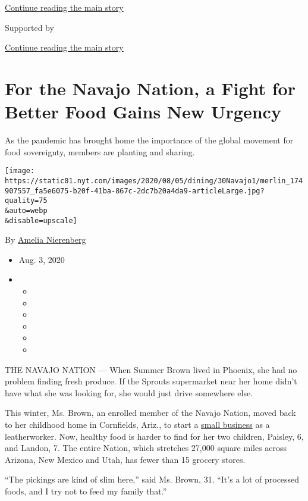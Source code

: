 \protect\hyperlink{after-top}{Continue reading the main story}

Supported by

\protect\hyperlink{after-sponsor}{Continue reading the main story}

\hypertarget{for-the-navajo-nation-a-fight-for-better-food-gains-new-urgency-}{%
\section{For the Navajo Nation, a Fight for Better Food Gains New
Urgency
}\label{for-the-navajo-nation-a-fight-for-better-food-gains-new-urgency-}}

As the pandemic has brought home the importance of the global movement
for food sovereignty, members are planting and sharing.

\texttt{[image: https://static01.nyt.com/images/2020/08/05/dining/30Navajo1/merlin\_174907557\_fa5e6075-b20f-41ba-867c-2dc7b20a4da9-articleLarge.jpg?quality=75\\\&auto=webp\\\&disable=upscale]}

By \href{https://www.nytimes.com/by/amelia-nierenberg}{Amelia
Nierenberg}

\begin{itemize}
\item
  Aug. 3, 2020
\item
  \begin{itemize}
  \item
  \item
  \item
  \item
  \item
  \item
  \end{itemize}
\end{itemize}

THE NAVAJO NATION --- When Summer Brown lived in Phoenix, she had no
problem finding fresh produce. If the Sprouts supermarket near her home
didn't have what she was looking for, she would just drive somewhere
else.

This winter, Ms. Brown, an enrolled member of the Navajo Nation, moved
back to her childhood home in Cornfields, Ariz., to start a
\href{https://www.lotusandlayneleather.com/}{small business} as a
leatherworker. Now, healthy food is harder to find for her two children,
Paisley, 6, and Landon, 7. The entire Nation, which stretches 27,000
square miles across Arizona, New Mexico and Utah, has fewer than 15
grocery stores.

``The pickings are kind of slim here,'' said Ms. Brown, 31. ``It's a lot
of processed foods, and I try not to feed my family that.''

